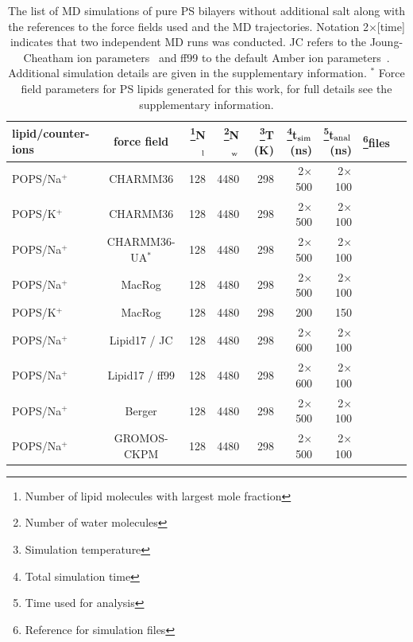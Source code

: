 \documentclass[aps,prl,superscriptaddress,twocolumn]{revtex4}
\begin{document}
\begin{table}[htb]
\centering
\caption{The list of MD simulations of pure PS bilayers without additional salt along with the references to the force fields used and the MD trajectories.
  Notation 2$\times$[time] indicates that two independent MD runs was conducted.
  JC refers to the Joung-Cheatham ion parameters~\cite{joung08} and ff99 to the default Amber ion parameters~\cite{aqvist90}.
  Additional simulation details are given in the supplementary information.
  $^*$ Force field parameters for PS lipids generated for this work, for full details see the supplementary information.
}\label{PSsystems}
\begin{tabular}{lcrrrrrcc}
lipid/counter-ions  & force field & \footnote{Number of lipid molecules with largest mole fraction}N$_{{\rm l}}$  & \footnote{Number of water molecules}N$_{{\rm w}}$  & \footnote{Simulation temperature}T (K)  & \footnote{Total simulation time}t$_{{\rm sim}}$(ns)  & \footnote{Time used for analysis}t$_{{\rm anal}}$ (ns)  & \footnote{Reference for simulation files}files & \tabularnewline
\hline 
POPS/Na$^{+}$  & CHARMM36 \cite{venable13}  & 128  & 4480  & 298  & 2$\times$500  & 2$\times$100  & \cite{charmm36POPS298K}  & \tabularnewline
POPS/K$^{+}$  & CHARMM36 \cite{venable13}  & 128  & 4480  & 298  & 2$\times$500  & 2$\times$100  & \cite{charmm36POPS298Kpotassium}  & \tabularnewline
POPS/Na$^{+}$  & CHARMM36-UA$^*$ \cite{venable13,lee14} & 128  & 4480  & 298  & 2$\times$500  & 2$\times$100  & \cite{charmm36uaPOPS298K}  & \tabularnewline
POPS/Na$^{+}$  & MacRog \cite{maciejewski14}  & 128  & 4480  & 298  & 2$\times$500  & 2$\times$100  & \cite{macrogPOPS298Kcorrect}  & \tabularnewline
POPS/K$^{+}$  & MacRog \cite{maciejewski14}  & 128  & 4480  & 298  & 200  & 150  & \cite{macrogPOPS298KwithK}  & \tabularnewline
POPS/Na$^{+}$  & Lipid17 \cite{gould18} / JC \cite{joung08}  & 128  & 4480  & 298  & 2$\times$600  & 2$\times$100  & \cite{lipid17POPSjcions}  & \tabularnewline
POPS/Na$^{+}$  & Lipid17 \cite{gould18} / ff99 \cite{aqvist90}  & 128  & 4480  & 298  & 2$\times$600  & 2$\times$100  & \cite{lipid17POPSff99ions}  & \tabularnewline
POPS/Na$^{+}$  & Berger \cite{mukhopadhyay04}  & 128  & 4480  & 298  & 2$\times$500  & 2$\times$100  & \cite{bergerPOPS298K}  & \tabularnewline
POPS/Na$^{+}$  & GROMOS-CKPM \cite{Chandrasekhar03,kukol09,piggot12} & 128  & 4480  & 298  & 2$\times$500  & 2$\times$100  & \cite{ckp1POPS303K}  & \tabularnewline

\end{tabular}
\end{table}
\end{document}

